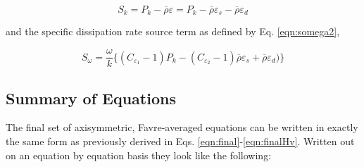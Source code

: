\begin{displaymath}
	S_k = P_k - \overline{\rho}\varepsilon  = P_k -\overline{\rho}\varepsilon_s - \overline{\rho}\varepsilon_d
\end{displaymath}

	and the specific dissipation rate source term as defined by Eq. \ref{eqn:somega2}, 

\begin{displaymath}
		S_\omega = \frac{\omega}{k}\Big\{(C_{\varepsilon_1}- 1)P_k - (C_{\varepsilon_2}-1)\overline{\rho}\varepsilon_s
		+ \overline{\rho}\varepsilon_d) \Big\}
\end{displaymath}

\subsection{Summary of Equations}

	The final set of axisymmetric, Favre-averaged equations can be written in exactly the same form as previously 
derived in Eqs. \ref{eqn:final}-\ref{eqn:finalHv}.  Written out on an equation by equation basis they look like the 
following:

